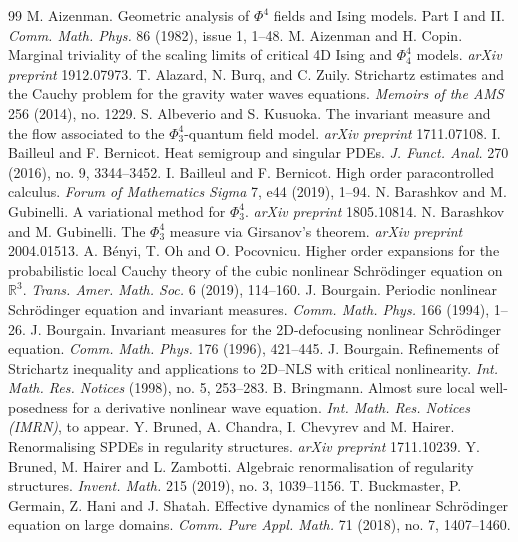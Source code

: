 \documentclass[11 pt,reqno]{amsart}
\theoremstyle{definition}
\theoremstyle{remark}
\numberwithin{equation}{section}
\begin{document}
{{ \begin{thebibliography}{99}
  M. Aizenman. Geometric analysis of $\Phi^4$ fields and Ising models. Part I and II. \emph{Comm. Math. Phys.} 86 (1982), issue 1, 1--48.
  M. Aizenman and H. Copin. Marginal triviality of the scaling limits of critical 4D Ising and $\Phi_4^4$ models. \emph{arXiv preprint} 1912.07973.
  T. Alazard, N. Burq, and C. Zuily. Strichartz estimates and the Cauchy problem for the gravity water waves equations. \emph{Memoirs of the AMS} 256 (2014), no. 1229.
  S. Albeverio and S. Kusuoka. The invariant measure and the flow associated to the $\Phi^ 4_3$-quantum field model. \emph{arXiv preprint} 1711.07108.
  I. Bailleul and F. Bernicot. Heat semigroup and singular PDEs. \emph{J. Funct. Anal.} 270 (2016), no. 9, 3344--3452.
  I. Bailleul and F. Bernicot. High order paracontrolled calculus. \emph{Forum of Mathematics Sigma} 7,  e44 (2019), 1--94. 
 N. Barashkov and M. Gubinelli. A variational method for $\Phi_3^4$. \emph{arXiv preprint} 1805.10814.
 N. Barashkov and M. Gubinelli. The $\Phi_3^4$ measure via Girsanov's theorem. \emph{arXiv preprint} 2004.01513.
 A. B\'{e}nyi, T. Oh and O. Pocovnicu. Higher order expansions for the probabilistic local Cauchy theory of the cubic nonlinear Schr\"{o}dinger equation on $\mathbb{R}^3$. \emph{Trans. Amer. Math. Soc.} 6 (2019), 114--160.
 J. Bourgain. Periodic nonlinear Schr\"{o}dinger equation and invariant measures. \emph{Comm. Math. Phys.} 166 (1994), 1--26.
  J. Bourgain. Invariant measures for the 2D-defocusing nonlinear Schr\"{o}dinger equation. \emph{Comm. Math. Phys.} 176 (1996), 421--445.
 J. Bourgain. Refinements of Strichartz inequality and applications to 2D--NLS with critical nonlinearity. \emph{Int. Math. Res. Notices} (1998), no. 5, 253--283.
  B. Bringmann. Almost sure local well-posedness for a derivative nonlinear wave equation. \emph{Int. Math. Res. Notices (IMRN)}, to appear.
Y. Bruned, A. Chandra, I. Chevyrev and M. Hairer. Renormalising SPDEs in regularity structures. \emph{arXiv preprint} 1711.10239.
  Y. Bruned, M. Hairer and L. Zambotti.  Algebraic renormalisation of regularity structures. \emph{Invent. Math.} 215 (2019), no. 3, 1039--1156.
 T. Buckmaster, P. Germain, Z. Hani and J. Shatah. Effective dynamics of the nonlinear Schr\"{o}dinger equation on large domains. \emph{Comm. Pure Appl. Math.} 71 (2018), no. 7, 1407--1460.

\end{thebibliography}}}
\end{document}
